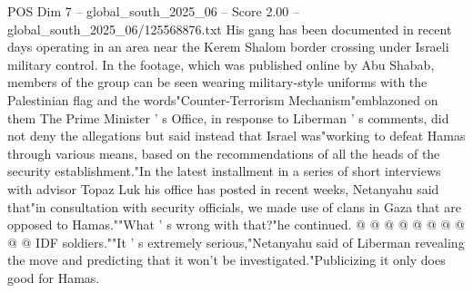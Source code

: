 \begin{textsample}{POS Dim 7 – global\_south\_2025\_06 – Score 2.00 – global\_south\_2025\_06/125568876.txt}
His gang has been documented in recent days operating in an area near the Kerem Shalom border crossing under Israeli military control.
In the footage, which was published online by Abu Shabab, members of the group can be seen wearing military-style uniforms with the Palestinian flag and the words"Counter-Terrorism Mechanism"emblazoned on them The Prime Minister ' s Office, in response to Liberman ' s comments, did not deny the allegations but said instead that Israel was"working to defeat Hamas through various means, based on the recommendations of all the heads of the security establishment."In the latest installment in a series of short interviews with advisor Topaz Luk his office has posted in recent weeks, Netanyahu said that"in consultation with security officials, we made use of clans in Gaza that are opposed to Hamas.""What ' s wrong with that?"he continued. @ @ @ @ @ @ @ @ @ @ IDF soldiers.""It ' s extremely serious,"Netanyahu said of Liberman revealing the move and predicting that it won't be investigated."Publicizing it only does good for Hamas.

\end{textsample}
